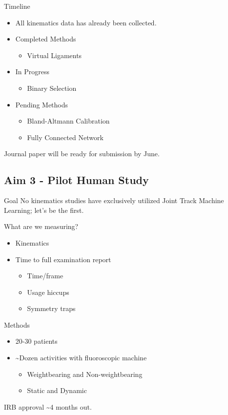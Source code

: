 \documentclass[presentation, aspectratio=1610]{beamer}
\begin{document}
\begin{frame}[label={sec:orgd36fe92}]{Timeline}
\begin{itemize}
\item All kinematics data has already been collected.
\item Completed Methods
\begin{itemize}
\item Virtual Ligaments
\end{itemize}
\item In Progress
\begin{itemize}
\item Binary Selection
\end{itemize}
\item Pending Methods
\begin{itemize}
\item Bland-Altmann Calibration
\item Fully Connected Network
\end{itemize}
\end{itemize}

Journal paper will be ready for submission by June.
\end{frame}
\subsection{Aim 3 - Pilot Human Study}
\label{sec:orgf828fac}
\begin{frame}[label={sec:org7cf5b36}]{Goal}
No kinematics studies have exclusively utilized Joint Track Machine Learning; let's be the first.

What are we measuring?
\begin{itemize}
\item Kinematics
\item Time to full examination report
\begin{itemize}
\item Time/frame
\item Usage hiccups
\item Symmetry traps
\end{itemize}
\end{itemize}
\end{frame}
\begin{frame}[label={sec:org3057ca8}]{Methods}
\begin{itemize}
\item 20-30 patients
\item \textasciitilde{}Dozen activities with fluoroscopic machine
\begin{itemize}
\item Weightbearing and Non-weightbearing
\item Static and Dynamic
\end{itemize}
\end{itemize}

IRB approval \textasciitilde{}4 months out.
\end{frame}
\end{document}
